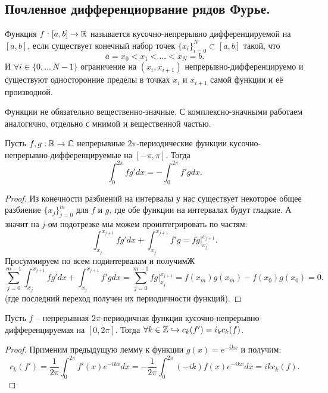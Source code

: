 \subsection{Почленное дифференциорвание рядов Фурье.}
\begin{reminder}
    Функция $f: [a, b] \to \mathbb{R}$ называется кусочно-непрерывно дифференцируемой на $[a, b]$, если существует конечный набор точек $\{x_i\}_{i = 0}^{N} \subset [a, b]$ такой, что
    \[
        a = x_0 < x_1 < \ldots < x_N = b.
    \]
    И $\forall i \in \{0, \ldots\, N - 1\}$ ограничение на $(x_i, x_{i + 1})$ непрерывно-дифференцируемо и существуют односторонние пределы в точках $x_i$ и $x_{i + 1}$ самой функции и её производной.
\end{reminder}
\begin{note}
    Функции не обязательно вещественно-значные. С комплексно-значными работаем аналогично, отдельно с мнимой и вещественной частью.
\end{note}
\begin{lemma}
    Пусть $f, g: \mathbb{R} \to \mathbb{C}$ непрерывные $2\pi$-периодические функции кусочно-непрерывно-дифференцируемые на $[-\pi, \pi]$.
    Тогда
    \[
        \int_0^{2\pi} f g' dx = - \int_0^{2\pi} f' g dx.
    \]
\end{lemma}
\begin{proof}
    Из конечности разбиений на интервалы у нас существует некоторое общее разбиение $\{x_j\}_{j = 0}^m$ для $f$ и $g$, где обе функции на интервалах будут гладкие.
    А значит на $j$-ом подотрезке мы можем проинтегрировать по частям:
    \[
        \int_{x_j}^{x_{j + 1}} f g' dx + \int_{x_j}^{x_{j + 1}} f' g = fg|_{x_j}^{x_{j + 1}}.
    \]
    Просуммируем по всем подинтервалам и получимЖ
    \[
        \sum\limits_{j = 0}^{m - 1} \int_{x_j}^{x_{j + 1}} fg'dx + \int_{x_{j}}^{x_{j + 1}}f' g dx = \sum\limits_{j = 0}^{m - 1} fg|_{x_j}^{x_{j + 1}} = f(x_m)g(x_m) - f(x_0)g(x_0) = 0.
    \]
    (где последний переход получен их периодичности функций).
\end{proof}
\begin{lemma}
    Пусть $f$ -- непрерывная $2\pi$-периодичная функция кусочно-непрерывно-дифференцируемая на $[0, 2\pi]$.
    Тогда $\forall k \in \mathbb{Z} \hookrightarrow c_k(f') = i_k c_k(f)$.
\end{lemma}
\begin{proof}
    Применим предыдущую лемму к функции $g(x) = e^{-i k x}$ и получим:
    \[
        c_k(f') = \frac{1}{2\pi} \int_0^{2\pi} f'(x)e^{-ikx}dx = -\frac{1}{2\pi} \int_0^{2\pi}(-i k)f(x)e^{-ikx}dx = ikc_k(f).
    \]
\end{proof}
